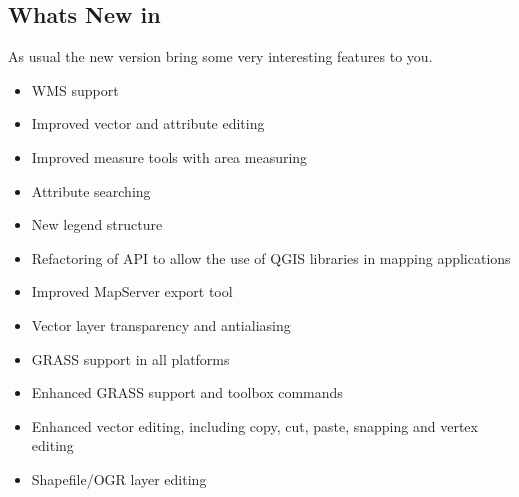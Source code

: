 \subsection{Whats New in \CURRENT}\label{label_whatsnew}
As usual the new version \CURRENT bring some very interesting features to you.
\begin{itemize}
\item WMS support
\item Improved vector and attribute editing
\item Improved measure tools with area measuring
\item Attribute searching
\item New legend structure
\item Refactoring of API to allow the use of QGIS libraries in mapping applications
\item Improved MapServer export tool
\item Vector layer transparency and antialiasing
\item GRASS support in all platforms
\item Enhanced GRASS support and toolbox commands
\item Enhanced vector editing, including copy, cut, paste, snapping and vertex editing
\item Shapefile/OGR layer editing
\end{itemize}


